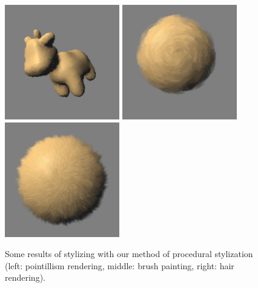 \begin{figure}
    \begin{center}
    \includegraphics[width=50mm, height=50mm]{Resultats/spotPoint/final.png}
    \includegraphics[width=50mm, height=50mm]{Resultats/painting1/final.png}
    \includegraphics[width=50mm, height=50mm]{Resultats/bouledepoil1/final.png}
    \end{center}
    \caption{Some results of stylizing with our method of procedural stylization (left: pointillism rendering, middle: brush painting, right: hair rendering).}
    \label{some_results}
\end{figure}
